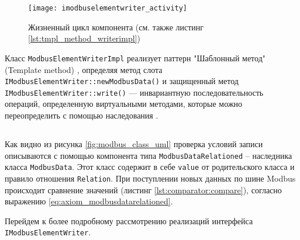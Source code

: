 \begin{center}
    \begin{figure}
        \texttt{[image: imodbuselementwriter\_activity]}
        \caption{Жизненный цикл компонента (см. также листинг \ref{lst:tmpl_method_writerimpl})}\label{fig:imodbuselementwriter_activity}
    \end{figure}
\end{center}


Класс \texttt{ModbusElementWriterImpl} реализует паттерн "Шаблонный метод" (Template method) \cite[стр. 309]{book:pattern:band_of_4},
определяя метод слота \texttt{IModbusElementWriter::newModbusData()}
и защищенный метод \texttt{IModbusElementWriter::write()} --- инвариантную последовательность операций,
определенную виртуальными методами, которые можно переопределить с помощью наследования \cite[стр. 170]{book:tdd:KentBeck}.




\subsection{}
Как видно из рисунка \ref{fig:modbus_class_uml} проверка условий записи описываются с помощью компонента типа
\texttt{ModbusDataRelationed} -- наследника класса \texttt{ModbusData}.
Этот класс содержит в себе \texttt{value} от родительского класса и правило отношения \texttt{Relation}.
При поступлении новых данных по шине Modbus происходит сравнение значений (листинг \ref{lst:comparator:compare}),
согласно выражению \ref{eq:axiom_modbusdatarelationed}.



Перейдем к более подробному рассмотрению реализаций интерфейса \texttt{IModbusElementWriter}.

